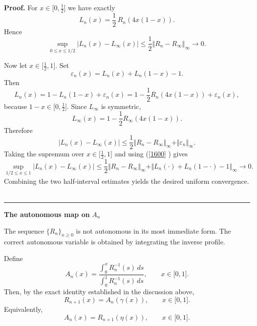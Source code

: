 \documentclass[onecolumn]{article}
\newenvironment{proof}[1][Proof]{\noindent\textbf{#1.} }{\ \rule{0.5em}{0.5em}}
\begin{document}
\begin{proof}
For $x\in \lbrack 0,\frac{1}{2}]$ we have exactly 
\begin{equation}
L_{n}(x)=\frac{1}{2}\,R_{n}\!(4x(1-x)).  \label{1609}
\end{equation}%
Hence 
\begin{equation}
\sup_{0\leq x\leq 1/2}|L_{n}(x)-L_{\infty }(x)|\leq \frac{1}{2}\Vert
R_{n}-R_{\infty }\Vert _{\infty }\longrightarrow 0.  \label{1610}
\end{equation}

Now let $x\in \lbrack \frac{1}{2},1]$. Set 
\begin{equation}
\varepsilon _{n}(x)=L_{n}(x)+L_{n}(1-x)-1.  \label{1611}
\end{equation}%
Then 
\begin{equation}
L_{n}(x)=1-L_{n}(1-x)+\varepsilon _{n}(x)=1-\frac{1}{2}R_{n}\!(4x(1-x))+%
\varepsilon _{n}(x),  \label{1612}
\end{equation}%
because $1-x\in \lbrack 0,\frac{1}{2}]$. Since $L_{\infty }$ is symmetric, 
\begin{equation}
L_{\infty }(x)=1-\frac{1}{2}R_{\infty }\!(4x(1-x)).  \label{1613}
\end{equation}%
Therefore 
\begin{equation}
|L_{n}(x)-L_{\infty }(x)|\leq \frac{1}{2}\Vert R_{n}-R_{\infty }\Vert
_{\infty }+\Vert \varepsilon _{n}\Vert _{\infty }.  \label{1614}
\end{equation}%
Taking the supremum over $x\in \lbrack \frac{1}{2},1]$ and using (\ref{1600}%
) gives 
\begin{equation}
\sup_{1/2\leq x\leq 1}|L_{n}(x)-L_{\infty }(x)|\leq \frac{1}{2}\Vert
R_{n}-R_{\infty }\Vert _{\infty }+\Vert L_{n}(\cdot )+L_{n}(1-\cdot )-1\Vert
_{\infty }\rightarrow 0.  \label{1615}
\end{equation}%
Combining the two half-interval estimates yields the desired uniform
convergence. \hfill
\end{proof}

\begin{flushleft}
\textbf{The autonomous map on }$A_{n}$
\end{flushleft}

The sequence $\{R_{n}\}_{n\geq 0}$ is not autonomous in its most immediate
form. The correct autonomous variable is obtained by integrating the inverse
profile.

Define 
\begin{equation}
A_{n}(x)=\frac{\int_{0}^{x}R_{n}^{-1}(s)\,ds}{\int_{0}^{1}R_{n}^{-1}(s)\,ds}%
,\qquad x\in \lbrack 0,1].  \label{1616}
\end{equation}%
Then, by the exact identity established in the discussion above, 
\begin{equation}
R_{n+1}(x)=A_{n}(\gamma (x)),\qquad x\in \lbrack 0,1].  \label{1617}
\end{equation}%
Equivalently, 
\begin{equation}
A_{n}(x)=R_{n+1}(\eta (x)),\qquad x\in \lbrack 0,1].  \label{1618}
\end{equation}
\end{document}

